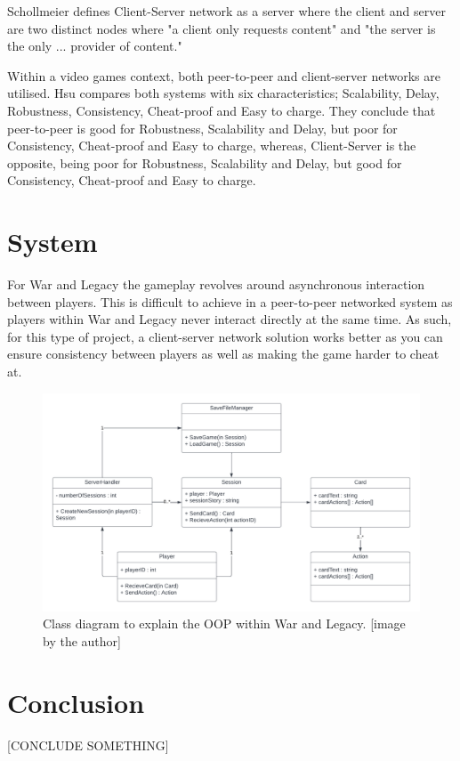 \documentclass{article}
\begin{document}
Schollmeier defines Client-Server network as a server where the client and server are two distinct nodes where "a client only requests content" and "the server is the only ... provider of content."

Within a video games context, both peer-to-peer and client-server networks are utilised. Hsu compares both systems\cite{hsu2003} with six characteristics; Scalability, Delay, Robustness, Consistency, Cheat-proof and Easy to charge. They conclude that peer-to-peer is good for Robustness, Scalability and Delay, but poor for Consistency, Cheat-proof and Easy to charge, whereas, Client-Server is the opposite, being poor for Robustness, Scalability and Delay, but good for Consistency, Cheat-proof and Easy to charge.

\section{System}
For War and Legacy the gameplay revolves around asynchronous interaction between players. This is difficult to achieve in a peer-to-peer networked system as players within War and Legacy never interact directly at the same time. As such, for this type of project, a client-server network solution works better as you can ensure consistency between players as well as making the game harder to cheat at.

\begin{figure}[!h]
    \centering
    \includegraphics[width=12cm]{class-diagram.png}
    \caption{Class diagram to explain the OOP within War and Legacy. [image by the author]}
\end{figure}

\section{Conclusion}
[CONCLUDE SOMETHING]


\printbibliography[filter=papers]
\printbibliography[type=software, title={Games}]

\listoffigures
\end{document}
